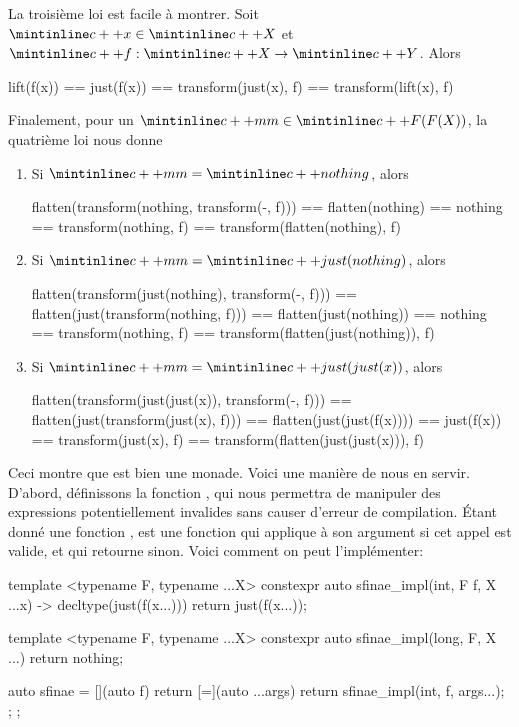La troisième loi est facile à montrer. Soit $\cc{x} \in \cc{X}$ et
$\cc{f} : \cc{X} \to \cc{Y}$. Alors
\begin{cpp}
    lift(f(x)) == just(f(x))
               == transform(just(x), f)
               == transform(lift(x), f)
\end{cpp}

Finalement, pour un $\cc{mm} \in \cc{F(F(X))}$, la quatrième loi nous donne
\begin{enumerate}
    \item Si $\cc{mm} = \cc{nothing}$, alors
    \begin{cpp}
        flatten(transform(nothing, transform(-, f)))
            == flatten(nothing)
            == nothing
            == transform(nothing, f)
            == transform(flatten(nothing), f)
    \end{cpp}

    \item Si $\cc{mm} = \cc{just(nothing)}$, alors
    \begin{cpp}
        flatten(transform(just(nothing), transform(-, f)))
            == flatten(just(transform(nothing, f)))
            == flatten(just(nothing))
            == nothing
            == transform(nothing, f)
            == transform(flatten(just(nothing)), f)
    \end{cpp}

    \item Si $\cc{mm} = \cc{just(just(x))}$, alors
    \begin{cpp}
        flatten(transform(just(just(x)), transform(-, f)))
            == flatten(just(transform(just(x), f)))
            == flatten(just(just(f(x))))
            == just(f(x))
            == transform(just(x), f)
            == transform(flatten(just(just(x))), f)
    \end{cpp}
\end{enumerate}

Ceci montre que  est bien une monade. Voici une manière de nous en
servir. D'abord, définissons la fonction , qui nous permettra de
manipuler des expressions potentiellement invalides sans causer d'erreur de
compilation. Étant donné une fonction ,  est une fonction
qui applique  à son argument si cet appel est valide, et qui retourne
 sinon. Voici comment on peut l'implémenter:
\begin{cpp}
    template <typename F, typename ...X>
    constexpr auto sfinae_impl(int, F f, X ...x) -> decltype(just(f(x...))) {
        return just(f(x...));
    }

    template <typename F, typename ...X>
    constexpr auto sfinae_impl(long, F, X ...) {
        return nothing;
    }

    auto sfinae = [](auto f) {
        return [=](auto ...args) {
            return sfinae_impl(int{}, f, args...);
        };
    };
\end{cpp}

